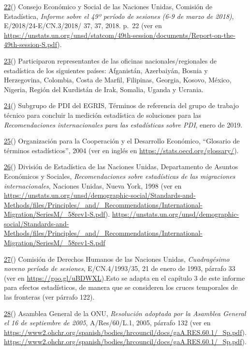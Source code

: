 \documentclass[
]{book}
\begin{document}
\protect\hyperlink{sdfootnote22anc}{22}() Consejo Económico y Social de las Naciones Unidas, Comisión de Estadística, \emph{Informe sobre el 49º período de sesiones (6-9 de marzo de 2018)}, E/2018/24-E/CN.3/2018/ 37, 37, 2018. p.~22 (ver en \url{https://unstats.un.org/unsd/statcom/49th-session/documents/Report-on-the-49th-session-S.pdf}).

\protect\hyperlink{sdfootnote23anc}{23}() Participaron representantes de las oficinas nacionales/regionales de estadística de los siguientes países: Afganistán, Azerbaiyán, Bosnia y Herzegovina, Colombia, Costa de Marfil, Filipinas, Georgia, Kosovo, México, Nigeria, Región del Kurdistán de Irak, Somalia, Uganda y Ucrania.

\protect\hyperlink{sdfootnote24anc}{24}() Subgrupo de PDI del EGRIS, Términos de referencia del grupo de trabajo técnico para concluir la medición estadística de soluciones para las \emph{Recomendaciones internacionales para las estadísticas sobre PDI}, enero de 2019.

\protect\hyperlink{sdfootnote25anc}{25}() Organización para la Cooperación y el Desarrollo Económico, ``Glosario de términos estadísticos'', 2004 (ver en inglés en \href{https://stats.oecd.org/glossary/detail.asp?ID=4350}{https://stats.oecd.org/glossary/}).

\protect\hyperlink{sdfootnote26anc}{26}() División de Estadística de las Naciones Unidas, Departamento de Asuntos Económicos y Sociales, \emph{Recomendaciones sobre estadísticas de las migraciones internacionales}, Naciones Unidas, Nueva York, 1998 (ver en \url{https://unstats.un.org/unsd/demographic-social/Standards-and-Methods/files/Principles/_and/_Recommendations/International-Migration/SeriesM/_58rev1-S.pdf}). \url{https://unstats.un.org/unsd/demographic-social/Standards-and-Methods/files/Principles/_and/_Recommendations/International-Migration/SeriesM/_58rev1-S.pdf}

\protect\hyperlink{sdfootnote27anc}{27}() Comisión de Derechos Humanos de las Naciones Unidas, \emph{Cuadragésimo noveno período de sesiones}, E/CN.4/1993/35, 21 de enero de 1993, párrafo 33 (ver en \url{https://goo.gl/uBDWXL}).Esto se adapta en el capítulo 3 de este informe para efectos estadísticos, de manera que se consideren los cruces temporales de las fronteras (ver párrafo 122).

\protect\hyperlink{sdfootnote28anc}{28}() Asamblea General de la ONU, \emph{Resolución adoptada por la Asamblea General el 16 de septiembre de 2005}, A/Res/60/L.1, 2005, párrafo 132 (ver en \url{https://www2.ohchr.org/spanish/bodies/hrcouncil/docs/gaA.RES.60.1/_Sp.pdf}). \url{https://www2.ohchr.org/spanish/bodies/hrcouncil/docs/gaA.RES.60.1/_Sp.pdf}).
\end{document}
